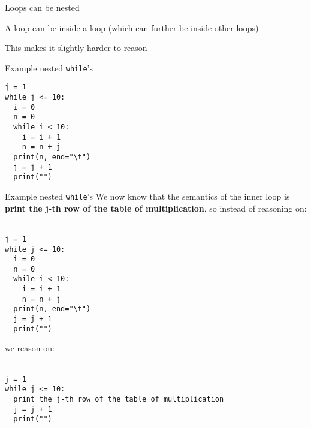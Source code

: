 \documentclass{beamer}
\begin{document}
\begin{slide}{
\item Loops can be nested
\item A loop can be inside a loop (which can further be inside other loops)
\item This makes it slightly harder to reason
}\end{slide}

\begin{frame}[fragile]{Example nested \texttt{while}'s}
\begin{lstlisting}[frame=shadowbox,basicstyle=\ttfamily\tiny]
j = 1
while j <= 10:
  i = 0
  n = 0
  while i < 10:
    i = i + 1
    n = n + j
  print(n, end="\t")
  j = j + 1
  print("")
\end{lstlisting}
\end{frame}

\begin{frame}[fragile]{Example nested \texttt{while}'s}
We now know that the semantics of the inner loop is \textbf{print the j-th row of the table of multiplication}, so instead of reasoning on: \\ \ \\

\begin{lstlisting}[frame=shadowbox,basicstyle=\ttfamily\tiny]
j = 1
while j <= 10:
  i = 0
  n = 0
  while i < 10:
    i = i + 1
    n = n + j
  print(n, end="\t")
  j = j + 1
  print("")
\end{lstlisting}

we reason on: \\ \ \\

\begin{lstlisting}[frame=shadowbox,basicstyle=\ttfamily\tiny]
j = 1
while j <= 10:
  print the j-th row of the table of multiplication
  j = j + 1
  print("")
\end{lstlisting}

\end{frame}
\end{document}
